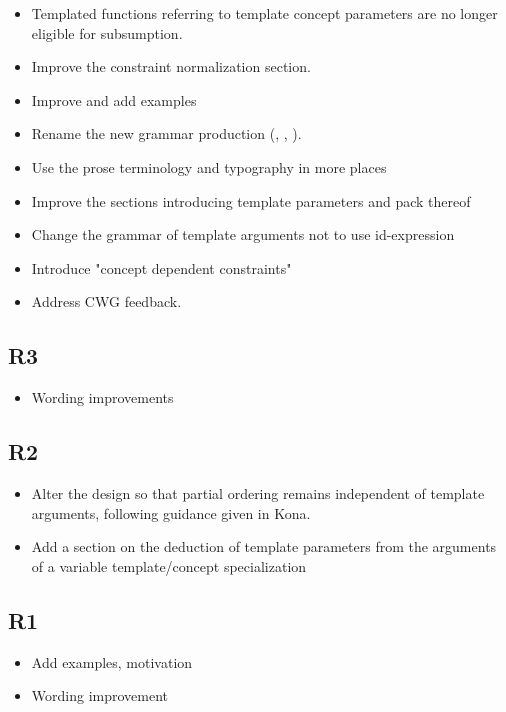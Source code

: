 \documentclass{wg21}
\begin{document}
\begin{itemize}

\item Templated functions referring to template concept parameters are no
longer eligible for subsumption.
\item Improve the constraint normalization section.
\item Improve and add examples
\item Rename the new grammar production (,
, ).
\item Use the prose terminology and typography in more places
\item Improve the sections introducing template parameters and pack thereof
\item Change the grammar of template arguments not to use id-expression
\item Introduce "concept dependent constraints"
\item Address CWG feedback.
\end{itemize}

\subsection{R3}

\begin{itemize}
\item Wording improvements
\end{itemize}

\subsection{R2}

\begin{itemize}
\item Alter the design so that partial ordering remains independent of template arguments, following guidance given in Kona.
\item Add a section on the deduction of template parameters from the arguments of a variable template/concept specialization
\end{itemize}


\subsection{R1}

\begin{itemize}
\item Add examples, motivation
\item Wording improvement
\end{itemize}
\end{document}
